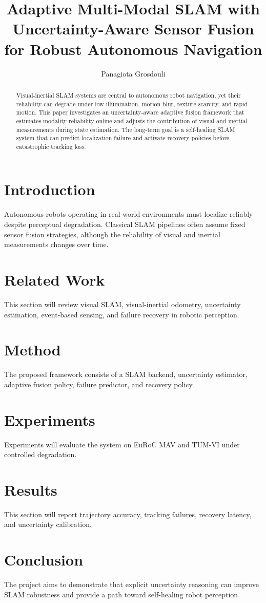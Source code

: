 \documentclass[conference]{IEEEtran}
\title{Adaptive Multi-Modal SLAM with Uncertainty-Aware Sensor Fusion for Robust Autonomous Navigation}
\author{Panagiota Grosdouli}
\begin{document}
\maketitle

\begin{abstract}
Visual-inertial SLAM systems are central to autonomous robot navigation, yet their reliability can degrade under low illumination, motion blur, texture scarcity, and rapid motion. This paper investigates an uncertainty-aware adaptive fusion framework that estimates modality reliability online and adjusts the contribution of visual and inertial measurements during state estimation. The long-term goal is a self-healing SLAM system that can predict localization failure and activate recovery policies before catastrophic tracking loss.
\end{abstract}

\section{Introduction}
Autonomous robots operating in real-world environments must localize reliably despite perceptual degradation. Classical SLAM pipelines often assume fixed sensor fusion strategies, although the reliability of visual and inertial measurements changes over time.

\section{Related Work}
This section will review visual SLAM, visual-inertial odometry, uncertainty estimation, event-based sensing, and failure recovery in robotic perception.

\section{Method}
The proposed framework consists of a SLAM backend, uncertainty estimator, adaptive fusion policy, failure predictor, and recovery policy.

\section{Experiments}
Experiments will evaluate the system on EuRoC MAV and TUM-VI under controlled degradation.

\section{Results}
This section will report trajectory accuracy, tracking failures, recovery latency, and uncertainty calibration.

\section{Conclusion}
The project aims to demonstrate that explicit uncertainty reasoning can improve SLAM robustness and provide a path toward self-healing robot perception.



\end{document}
